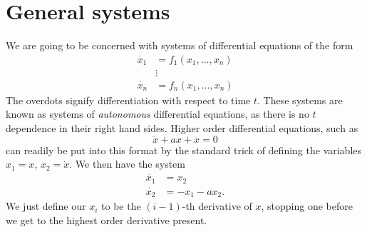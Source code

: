 \section{General systems}
We are going to be concerned with systems of differential equations of the
form 
\begin{equation}
    \begin{split}
        \dot{x_1} &= f_1(x_1, \ldots, x_n) \\
        &\vdots \\
        \dot{x_n} &= f_n(x_1, \ldots, x_n)
    \end{split}
\end{equation}
The overdots signify differentiation with respect to time $t$. These
systems are known as systems of \emph{autonomous} differential equations,
as there is no $t$ dependence in their right hand sides. Higher order
differential equations, such as 
\begin{equation*}
    \ddot{x} + a\dot{x} + x = 0
\end{equation*}
can readily be put into this format by the standard trick of defining the
variables $x_1 = x$, $x_2 = \dot{x}$. We then have the system
\begin{equation*}
    \begin{split}
        \dot{x_1} &= x_2 \\
        \dot{x_2} &= -x_1 - ax_2.
    \end{split}
\end{equation*}
We just define our $x_i$ to be the $(i-1)$-th derivative of $x$,
stopping one before we get to the highest order derivative present.

